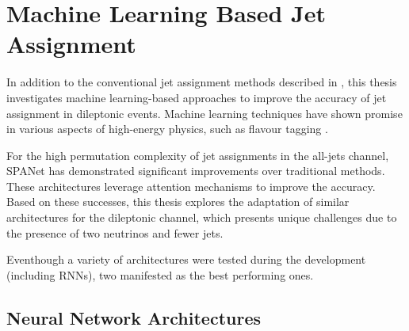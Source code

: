 \chapter{Machine Learning Based Jet Assignment}
\label{chap:ml-jet-selection}

In addition to the conventional jet assignment methods described in , this thesis investigates machine learning-based approaches to improve the accuracy of jet assignment in dileptonic \ttbar events. Machine learning techniques have shown promise in various aspects of high-energy physics, such as flavour tagging \cite{flavour_tagging_review}.

For the high permutation complexity of jet assignments in the all-jets channel, SPANet \cite{spanet} has demonstrated significant improvements over traditional methods. These architectures leverage attention mechanisms to improve the accuracy.
Based on these successes, this thesis explores the adaptation of similar architectures for the dileptonic \ttbar channel, which presents unique challenges due to the presence of two neutrinos and fewer jets.

Eventhough a variety of architectures were tested during the development (including RNNs), two manifested as the best performing ones.

\section{Neural Network Architectures}
